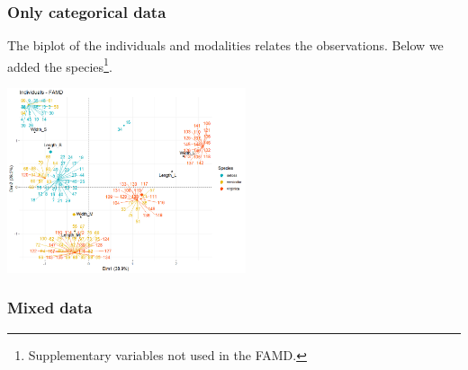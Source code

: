 \begin{frame}
\frametitle{Only categorical data}
The biplot of the individuals and modalities relates the observations. Below we added the species\footnote{Supplementary variables not used in the FAMD.}.
\begin{center}
\includegraphics[width=7cm]{../../Graphs/FAMD_biplot_species.png}
\end{center}
\end{frame}
\begin{frame}
\frametitle{Mixed data}

\end{frame}
